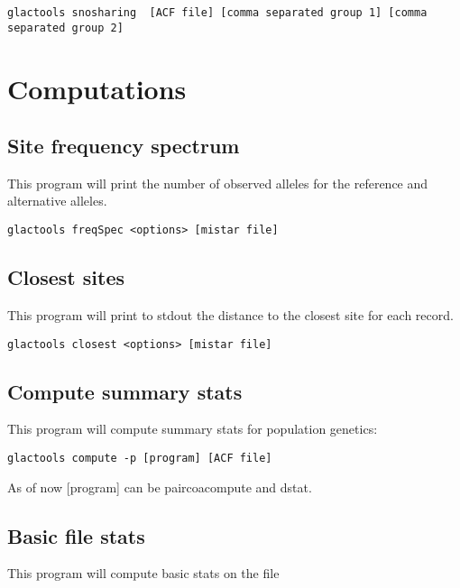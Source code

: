 \documentclass[a4paper]{article}
\begin{document}
\small
\begin{lstlisting}
glactools snosharing  [ACF file] [comma separated group 1] [comma separated group 2]
\end{lstlisting}
\normalsize

\section{Computations}


\subsection{Site frequency spectrum}

\noindent This program will print the number of observed alleles for the reference and alternative alleles.

\begin{lstlisting}
glactools freqSpec <options> [mistar file]
\end{lstlisting}

\subsection{Closest sites}

\noindent This program will print to stdout the distance to the closest site for each record.

\begin{lstlisting}
glactools closest <options> [mistar file]
\end{lstlisting}


\subsection{Compute summary stats}

\noindent This program will compute summary stats for population genetics:

\begin{lstlisting}
glactools compute -p [program] [ACF file]
\end{lstlisting}

As of now [program] can be paircoacompute and dstat.



\subsection{Basic file stats}

\noindent This program will compute basic stats on the file
\end{document}
